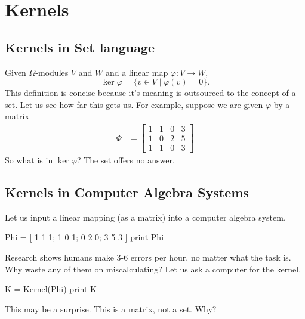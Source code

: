 \documentclass[12pt,twoside,dvipsnames,letterpaper]{memoir}
\author{James B. Wilson}
\date{\today}
\begin{document}
\section*{Kernels}

\subsection{Kernels in Set language}
Given $\Omega$-modules $V$ and $W$ and a linear map $\varphi:V\to W$, 
\[
    \ker \varphi=\{v\in V\mid \varphi(v)=0\}.
\]
This definition is concise because it's meaning
is outsourced to the concept of a set. Let us see how 
far this gets us. 
For example, suppose we are given $\varphi$ by a matrix 
\begin{align*}
    \Phi & = 
    \begin{bmatrix}
        1 & 1 & 0 & 3\\
        1 & 0 & 2 & 5\\
        1 & 1 & 0 & 3
    \end{bmatrix}
\end{align*}
So what is in $\ker\varphi$?  The set 
offers no answer.


\subsection{Kernels in Computer Algebra Systems}

Let us input a linear mapping (as a matrix) into a computer algebra system.
\begin{notebookin}
Phi = [ 1 1 1; 1 0 1; 0 2 0; 3 5 3 ]
print Phi
\end{notebookin}
\begin{notebookout}[\thenotebookcounter]
[ 1 1 0 3 ]
[ 1 0 2 5 ]
[ 1 1 0 3 ]
\end{notebookout}
Research shows humans make 3-6 errors per hour, no matter 
what the task is.  Why waste any of 
them on miscalculating?  Let us ask a computer for the kernel.
\begin{notebookin}
K = Kernel(Phi)
print K
\end{notebookin}
\begin{notebookout}[\thenotebookcounter]
[ -2 -5 ]
[  2  2 ]
[  1  0 ]
[  0  1 ]
\end{notebookout}
This may be a surprise.  This is a matrix, not a 
set.  Why?
\end{document}
